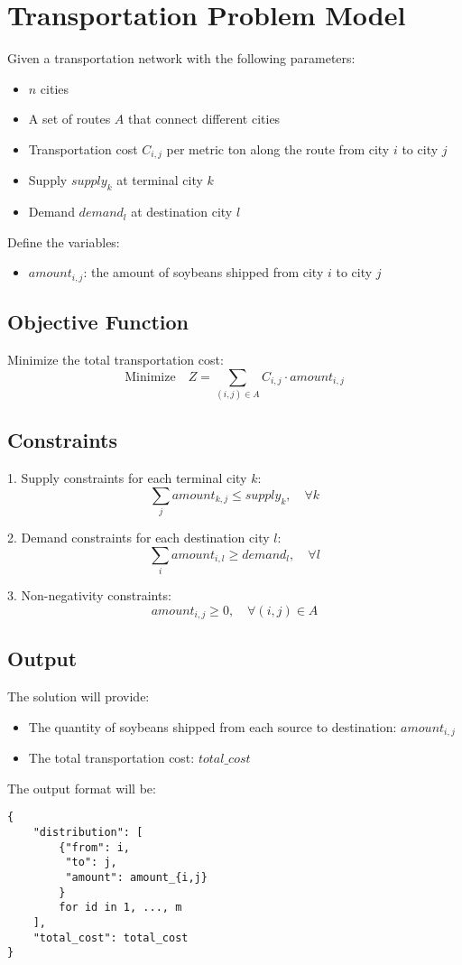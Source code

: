\documentclass{article}
\begin{document}
\section*{Transportation Problem Model}

Given a transportation network with the following parameters:

\begin{itemize}
    \item \( n \) cities
    \item A set of routes \( A \) that connect different cities
    \item Transportation cost \( C_{i,j} \) per metric ton along the route from city \( i \) to city \( j \)
    \item Supply \( supply_k \) at terminal city \( k \)
    \item Demand \( demand_l \) at destination city \( l \)
\end{itemize}

Define the variables:
\begin{itemize}
    \item \( amount_{i,j} \): the amount of soybeans shipped from city \( i \) to city \( j \)
\end{itemize}

\subsection*{Objective Function}
Minimize the total transportation cost:
\[
\text{Minimize} \quad Z = \sum_{(i,j) \in A} C_{i,j} \cdot amount_{i,j}
\]

\subsection*{Constraints}

1. Supply constraints for each terminal city \( k \):
\[
\sum_{j} amount_{k,j} \leq supply_k, \quad \forall k
\]

2. Demand constraints for each destination city \( l \):
\[
\sum_{i} amount_{i,l} \geq demand_l, \quad \forall l
\]

3. Non-negativity constraints:
\[
amount_{i,j} \geq 0, \quad \forall (i,j) \in A
\]

\subsection*{Output}
The solution will provide:
\begin{itemize}
    \item The quantity of soybeans shipped from each source to destination: \( amount_{i,j} \)
    \item The total transportation cost: \( total\_cost \)
\end{itemize}

The output format will be:
\begin{verbatim}
{
    "distribution": [
        {"from": i,
         "to": j,
         "amount": amount_{i,j}
        }
        for id in 1, ..., m
    ],
    "total_cost": total_cost
}
\end{verbatim}
\end{document}
